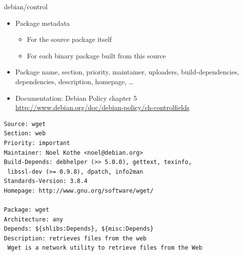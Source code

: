 \documentclass[10pt,final]{beamer}
\begin{document}
\begin{frame}[fragile=singleslide]{debian/control}
  \hbr
  \begin{itemize}
  \item Package metadata
    \begin{itemize}
    \item For the source package itself
    \item For each binary package built from this source
    \end{itemize}
    \hbr
  \item Package name, section, priority, maintainer, uploaders,
    build-dependencies, dependencies, description, homepage, \ldots \hbr
  \item Documentation: Debian Policy chapter 5\\
    \url{http://www.debian.org/doc/debian-policy/ch-controlfields}
  \end{itemize}
  \seprule
\begin{lstlisting}[basicstyle=\ttfamily\footnotesize]
Source: wget
Section: web
Priority: important
Maintainer: Noel Kothe <noel@debian.org>
Build-Depends: debhelper (>> 5.0.0), gettext, texinfo,
 libssl-dev (>= 0.9.8), dpatch, info2man
Standards-Version: 3.8.4
Homepage: http://www.gnu.org/software/wget/

Package: wget
Architecture: any
Depends: ${shlibs:Depends}, ${misc:Depends}
Description: retrieves files from the web
 Wget is a network utility to retrieve files from the Web
\end{lstlisting}
\end{frame}
\end{document}
